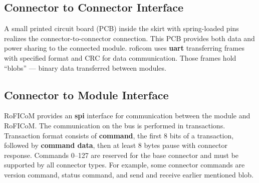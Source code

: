 \documentclass[
  digital,     %
  oneside,     %
  nosansbold,  %
  nocolorbold, %
  nolof,         %
  nolot,         %
]{fithesis4}
\newcommand{\TODO}[1]{\textcolor{red}{\textit{#1}}}
\begin{document}
\subsection{ Connector to Connector Interface }

A small printed circuit board (PCB) inside the skirt with spring-loaded pins realizes the connector-to-connector connection. This PCB provides both
data and power sharing to the connected module.
\acrshort{roficom} uses \textbf{\acrshort{uart}} transferring frames with specified format and CRC for data communication. Those frames hold ``blobs'' ---
binary data transferred between modules. 

\subsection{ Connector to Module Interface }
RoFICoM provides an \textbf{\acrshort{spi}} interface for communication between the module and RoFICoM. The communication on the bus is performed
in transactions. Transaction format consists of \textbf{command}, the first 8 bits of a transaction, followed by \textbf{command
data}, then at least 8 bytes pause with connector response. Commands \numrange{0}{127} are reserved for the base connector and must be supported by all
connector types. For example, some connector commands are version command, status command, and send and receive earlier
mentioned blob.
\end{document}
